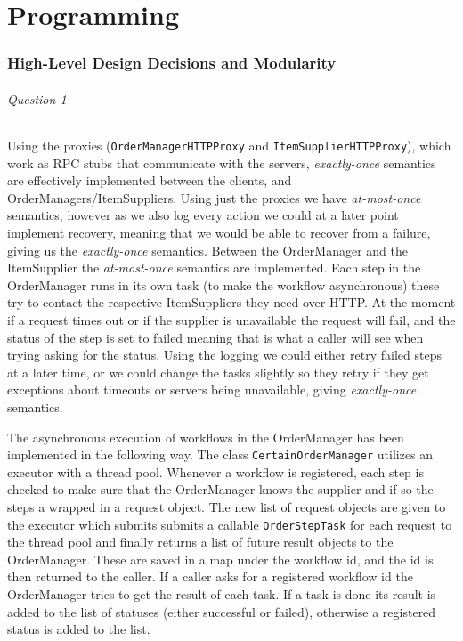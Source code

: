 \documentclass[a4paper, 11pt]{article}
\begin{document}



\newpage
\part{Programming} %
\label{prt:programming_}

\section{High-Level Design Decisions and Modularity} %
\label{sec:high_level_design_decisions_and_modularity}

\paragraph{Question 1} %
\label{par:question_1}

Using the proxies (\texttt{OrderManagerHTTPProxy} and \texttt{Item\-SupplierHTTPProxy}), which work as RPC stubs that communicate with the servers, \textit{exactly-once} semantics are effectively implemented between the clients, and OrderManagers/ItemSuppliers. Using just the proxies we have \textit{at-most-once} semantics, however as we also log every action we could at a later point implement recovery, meaning that we would be able to recover from a failure, giving us the \textit{exactly-once} semantics. Between the OrderManager and the ItemSupplier the \textit{at-most-once} semantics are implemented. Each step in the OrderManager runs in its own task (to make the workflow asynchronous) these try to contact the respective ItemSuppliers they need over HTTP. At the moment if a request times out or if the supplier is unavailable the request will fail, and the status of the step is set to failed meaning that is what a caller will see when trying asking for the status. Using the logging we could either retry failed steps at a later time, or we could change the tasks slightly so they retry if they get exceptions about timeouts or servers being unavailable, giving \textit{exactly-once} semantics.

The asynchronous execution of workflows in the OrderManager has been implemented in the following way. The class \texttt{CertainOrderManager} utilizes an executor with a thread pool. Whenever a workflow is registered, each step is checked to make sure that the OrderManager knows the supplier and if so the steps a wrapped in a request object. The new list of request objects are given to the executor which submits submits a callable \texttt{OrderStepTask} for each request to the thread pool and finally returns a list of future result objects to the OrderManager. These are saved in a map under the workflow id, and the id is then returned to the caller. If a caller asks for a registered workflow id the OrderManager tries to get the result of each task. If a task is done its result is added to the list of statuses (either successful or failed), otherwise a registered status is added to the list.
\end{document}
